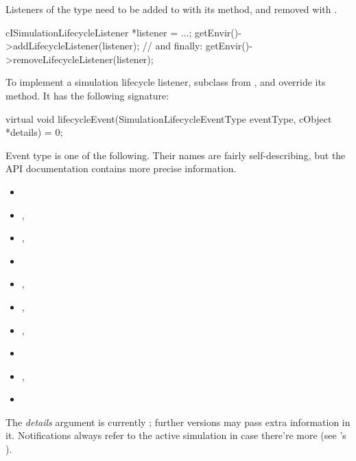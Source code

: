Listeners of the type  need to be
added to  with its  method,
and removed with .

\begin{cpp}
cISimulationLifecycleListener *listener = ...;
getEnvir()->addLifecycleListener(listener);
// and finally:
getEnvir()->removeLifecycleListener(listener);
\end{cpp}

To implement a simulation lifecycle listener, subclass from
, and override its
 method. It has the following signature:

\begin{cpp}
virtual void lifecycleEvent(SimulationLifecycleEventType eventType, cObject *details) = 0;
\end{cpp}


Event type is one of the following. Their names are fairly self-describing,
but the API documentation contains more precise information.

\begin{itemize}[noitemsep]
  \item {}
  \item {}, 
  \item {}, 
  \item {}
  \item {}, 
  \item {}, 
  \item {}, 
  \item {}
  \item {}, 
  \item {}
\end{itemize}

The \textit{details} argument is currently ; further {\opp}
versions may pass extra information in it. Notifications always refer to
the active simulation in case there're more (see 's
).

